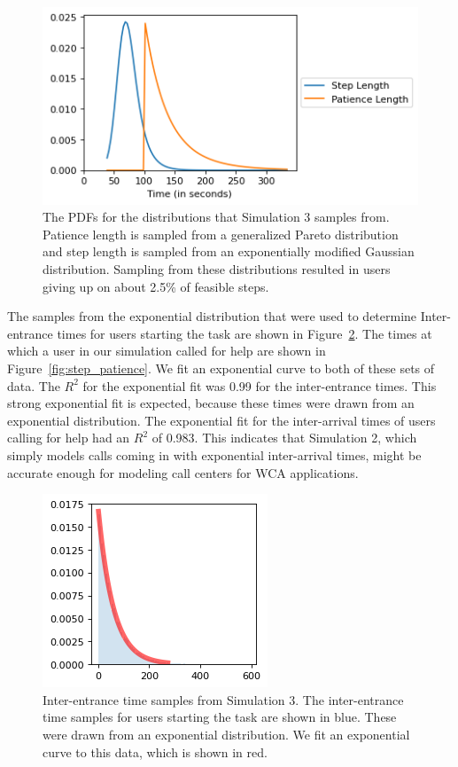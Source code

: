 \begin{figure}[H]
  \includegraphics{figures/montecarlo/step_patience.png}
  \caption[The PDFs for the distributions that Simulation 3 samples from]{
    The PDFs for the distributions that Simulation 3 samples from.
    Patience length is sampled from a generalized Pareto distribution and step
    length is sampled from an exponentially modified Gaussian distribution.
    Sampling from these distributions resulted in users giving up on about 2.5\%
    of feasible steps.
  }\label{fig:sim3_dists}
\end{figure}

\pagebreak

The samples from the exponential distribution that were used to determine
Inter-entrance times for users starting the task are shown in
Figure~\ref{fig:arrival_times}.
The times at which a user in our simulation called for help are shown in
Figure~\ref{fig:step_patience}.
We fit an exponential curve to both of these sets of data.
The $R^2$ for the exponential fit was 0.99 for the inter-entrance times.
This strong exponential fit is expected, because these times were drawn from an
exponential distribution.
The exponential fit for the inter-arrival times of users calling for help had
an $R^2$ of 0.983.
This indicates that Simulation 2, which simply models calls coming in with
exponential inter-arrival times, might be accurate enough for modeling call
centers for WCA applications.

\begin{figure}[H]
  \includegraphics{figures/montecarlo/arrival_times.png}
  \vspace{-0.25cm}
  \caption[Inter-entrance time samples from Simulation 3]{
    Inter-entrance time samples from Simulation 3.
    The inter-entrance time samples for users starting the task are shown in
    blue.
    These were drawn from an exponential distribution.
    We fit an exponential curve to this data, which is shown in red.
  }\label{fig:arrival_times}
\end{figure}

